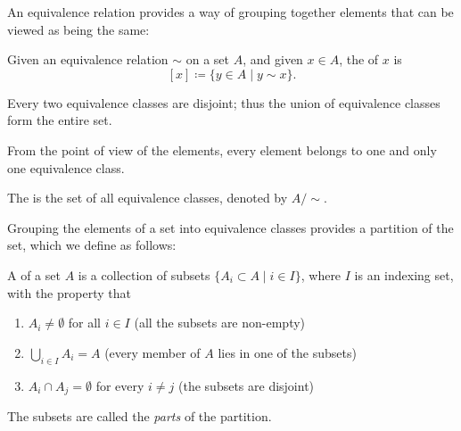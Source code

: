 An equivalence relation provides a way of grouping together elements that can be viewed as being the same:

\begin{definition}
Given an equivalence relation $\sim$ on a set $A$, and given $x \in A$, the  of $x$ is
\[[x]\coloneqq\{y\in A\mid y\sim x\}.\]
\end{definition}

\begin{proposition}
Every two equivalence classes are disjoint; thus the union of equivalence classes form the entire set.
\end{proposition}

\begin{remark}
From the point of view of the elements, every element belongs to one and only one equivalence class.
\end{remark}

\begin{definition}
The  is the set of all equivalence classes, denoted by $A/\sim$.
\end{definition}

Grouping the elements of a set into equivalence classes provides a partition of the set, which we define as follows:

\begin{definition}[Partition]
A  of a set $A$ is a collection of subsets $\{A_i\subset A\mid i\in I\}$, where $I$ is an indexing set, with the property that
\begin{enumerate}[label=(\roman*)]
\item $A_i\neq\emptyset$ for all $i\in I$ (all the subsets are non-empty)
\item $\bigcup_{i\in I}A_i=A$ (every member of $A$ lies in one of the subsets)
\item $A_i\cap A_j=\emptyset$ for every $i\neq j$ (the subsets are disjoint)
\end{enumerate}
The subsets are called the \emph{parts} of the partition.
\end{definition}


